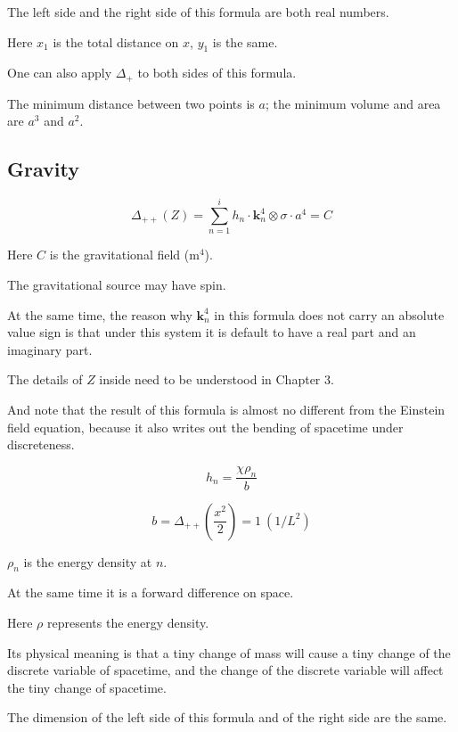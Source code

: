\documentclass[UTF8]{article}
\begin{document}
The left side and the right side of this formula are both real numbers.

Here \(x_1\) is the total distance on \(x\), \(y_1\) is the same.

One can also apply \(\Delta_+\) to both sides of this formula.

The minimum distance between two points is \(a\); the minimum volume and area are \(a^3\) and \(a^2\).

\subsection{Gravity}

\begin{equation}
\Delta_{++}(Z)=\sum_{n=1}^{i}h_n\cdot\mathbf{k}^4_n\otimes\sigma\cdot a^4=C
\end{equation}

Here \(C\) is the gravitational field (m\(^4\)).

The gravitational source may have spin.

At the same time, the reason why \(\mathbf{k}^4_n\) in this formula does not carry an absolute value sign is that under this system it is default to have a real part and an imaginary part.

The details of \(Z\) inside need to be understood in Chapter 3.

And note that the result of this formula is almost no different from the Einstein field equation, because it also writes out the bending of spacetime under discreteness.

\begin{equation}
h_n=\frac{\chi\rho_n}{b}
\end{equation}

\begin{equation}
b=\Delta_{++}\left(\frac{x^2}{2}\right)=1\ (1/L^2)
\end{equation}

\(\rho_n\) is the energy density at \(n\).

At the same time it is a forward difference on space.

Here \(\rho\) represents the energy density.

Its physical meaning is that a tiny change of mass will cause a tiny change of the discrete variable of spacetime, and the change of the discrete variable will affect the tiny change of spacetime.

The dimension of the left side of this formula and of the right side are the same.
\end{document}
